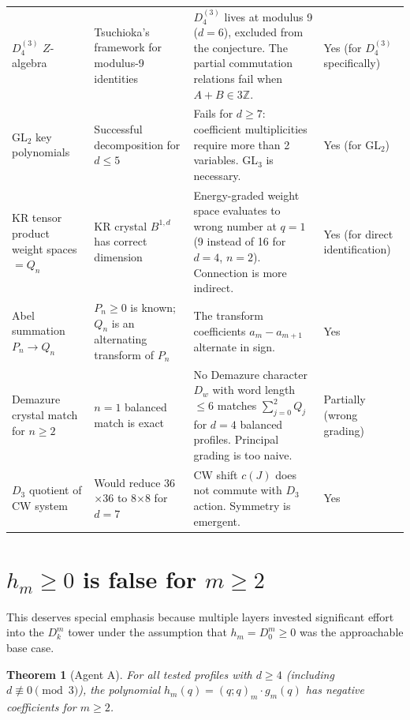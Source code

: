 \documentclass[11pt]{article}
\newtheorem{theorem}{Theorem}[section]
\theoremstyle{definition}
\begin{document}
\begin{longtable}{@{}p{3.5cm}p{4cm}p{4cm}p{2.5cm}@{}}
$D_4^{(3)}$ $Z$-algebra &
Tsuchioka's framework for modulus-9 identities &
$D_4^{(3)}$ lives at modulus 9 ($d = 6$), excluded from the conjecture. The partial commutation relations fail when $A + B \in 3\mathbb{Z}$. &
Yes (for $D_4^{(3)}$ specifically) \\

GL$_2$ key polynomials &
Successful decomposition for $d \leq 5$ &
Fails for $d \geq 7$: coefficient multiplicities require more than 2 variables. GL$_3$ is necessary. &
Yes (for GL$_2$) \\

KR tensor product weight spaces $= Q_n$ &
KR crystal $B^{1,d}$ has correct dimension &
Energy-graded weight space evaluates to wrong number at $q = 1$ (9 instead of 16 for $d=4$, $n=2$). Connection is more indirect. &
Yes (for direct identification) \\

Abel summation $P_n \to Q_n$ &
$P_n \geq 0$ is known; $Q_n$ is an alternating transform of $P_n$ &
The transform coefficients $a_m - a_{m+1}$ alternate in sign. &
Yes \\

Demazure crystal match for $n \geq 2$ &
$n=1$ balanced match is exact &
No Demazure character $D_w$ with word length $\leq 6$ matches $\sum_{j=0}^2 Q_j$ for $d=4$ balanced profiles. Principal grading is too naive. &
Partially (wrong grading) \\ \label{sec:demazure_fail}

$D_3$ quotient of CW system &
Would reduce 36$\times$36 to 8$\times$8 for $d=7$ &
CW shift $c(J)$ does not commute with $D_3$ action. Symmetry is emergent. &
Yes \\
\end{longtable}


\section{\texorpdfstring{$h_m \geq 0$}{h\_m >= 0} is false for \texorpdfstring{$m \geq 2$}{m >= 2}}\label{sec:hm_negative}

This deserves special emphasis because multiple layers invested significant effort into the $D_k^m$ tower under the assumption that $h_m = D_0^m \geq 0$ was the approachable base case.

\begin{theorem}[Agent A]\label{thm:hm_neg}
For all tested profiles with $d \geq 4$ (including $d \not\equiv 0\!\pmod{3}$), the polynomial $h_m(q) = (q;q)_m \cdot g_m(q)$ has negative coefficients for $m \geq 2$.
\end{theorem}
\end{document}
